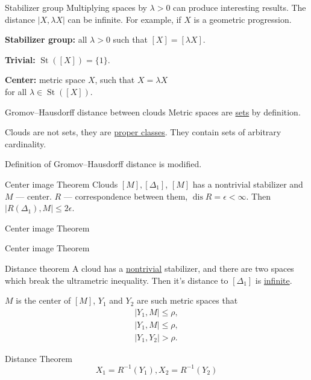 \documentclass[12pt]{beamer}
\DeclareMathOperator{\St}{St}
\DeclareMathOperator{\dis}{dis}
\begin{document}
\begin{frame}[allowframebreaks]{Stabilizer group}
Multiplying spaces by \(\lambda > 0\) can produce interesting results. The distance $|X,\lambda X|$ can be infinite. For example, if $X$ is a geometric progression.

\textbf{Stabilizer group:} all $\lambda > 0$ such that $[X] = [\lambda X]$.

\textbf{Trivial:} $\St\left([X]\right) = \{1\}$.

\textbf{Center:} metric space $X$, such that $X = \lambda X$ \\for all $\lambda \in \St([X])$.
\end{frame}

\begin{frame}[allowframebreaks]{Gromov--Hausdorff distance between clouds}
Metric spaces are \underline{sets} by definition. 

Clouds are not sets, they are \underline{proper classes}. They contain sets of arbitrary cardinality.

Definition of Gromov--Hausdorff distance is modified.
\end{frame}

\begin{frame}[allowframebreaks]{Center image Theorem}
Clouds $[M], [\Delta_1]$, $[M]$ has a nontrivial stabilizer and $M$ --- center. $R$ --- correspondence between them, $\dis R = \epsilon < \infty$. Then  $\big|R(\Delta_1), M\big| \le 2\epsilon$.
\end{frame}

\begin{frame}[allowframebreaks]{Center image Theorem}

\end{frame}

\begin{frame}[allowframebreaks]{Center image Theorem}

\end{frame}

\begin{frame}[allowframebreaks]{Distance theorem}
A cloud has a \underline{nontrivial} stabilizer, and there are two spaces which break the ultrametric inequality. Then it's distance to $[\Delta_1]$ is \underline{infinite}.

$M$ is the center of $[M]$, $Y_1$ and $Y_2$ are such metric spaces that 
\begin{gather*}
    |Y_1, M| \le \rho,\\
    |Y_1,M| \le \rho,\\
    |Y_1,Y_2| > \rho.
\end{gather*}
\end{frame}

\begin{frame}[allowframebreaks]{Distance Theorem}
\[X_1 = R^{-1}(Y_1), X_2 = R^{-1}(Y_2)\]

\end{frame}


\end{document}
